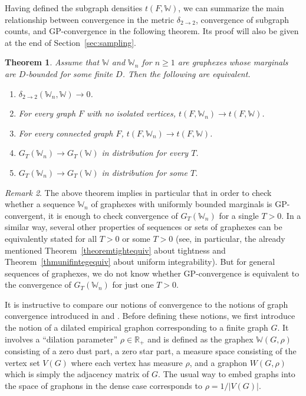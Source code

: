 \documentclass{amsart}
\numberwithin{equation}{section}
\numberwithin{figure}{section}
\newtheorem{theorem}{Theorem}[section]
\theoremstyle{definition}
\theoremstyle{remark}
\newtheorem{remark}[theorem]{Remark}
\newcommand{\RR}{\mathbb{R}}
\newcommand{\cW}{\mathbb{W}}
\newcommand{\deltt}{\delta_{2\to 2}}
\begin{document}
Having defined the subgraph densities $t(F,\cW)$, we can summarize the main
relationship between convergence in the metric $\deltt$, convergence of
subgraph counts, and GP-convergence in the following theorem. Its proof will
also be given at the end of Section~\ref{sec:sampling}.

\begin{theorem} \label{thm:D-bounded-convergence}
Assume that $\cW$ and $\cW_n$ for $n\geq 1$ are graphexes whose marginals are
$D$-bounded for some finite $D$. Then the following are equivalent.
\begin{enumerate}
\item $\deltt(\cW_n,\cW)\to 0$.\label{graphexconvdeltt-d}
\item For every graph $F$ with no isolated vertices, $t(F,\cW_n)
    \rightarrow t(F,\cW)$. \label{graphexconvnoisol-d}
\item For every connected graph $F$, $t(F,\cW_n) \rightarrow t(F,\cW)$.
    \label{graphexconvconn-d}
\item $G_T(\cW_n)\rightarrow G_T(\cW)$ in distribution for every $T$.
    \label{graphexconvallT-d}
\item $G_T(\cW_n)\rightarrow G_T(\cW)$ in distribution for some $T$.
    \label{graphexconvoneT-d}
\end{enumerate}
\end{theorem}

\begin{remark}
The above theorem implies in particular that in order to check whether a
sequence $\cW_n$ of graphexes with uniformly bounded marginals is
GP-convergent, it is enough to check convergence of $G_T(\cW_n)$ for a single
$T>0$. In a similar way, several other properties of sequences or sets of
graphexes can be equivalently stated for all $T>0$ or some $T>0$ (see, in
particular, the already mentioned Theorem~\ref{theoremtightequiv} about
tightness and Theorem~\ref{thmunifintegequiv} about uniform integrability).
But for general sequences of graphexes, we do not know whether GP-convergence
is equivalent to the convergence of $G_T(\cW_n)$ for just one $T>0$.
\end{remark}

It is instructive to compare our notions of convergence to the notions of
graph convergence introduced in \cite{BCCH16} and \cite{BCCV17}. Before
defining these notions, we first introduce the notion of a dilated empirical
graphon corresponding to a finite graph $G$. It involves a ``dilation
parameter'' $\rho\in\RR_+$ and is defined as the graphex $\cW(G,\rho)$
consisting of a zero dust part, a zero star part, a measure space consisting
of the vertex set $V(G)$ where each vertex has measure $\rho$, and a graphon
$W(G,\rho)$ which is simply the adjacency matrix of $G$. The usual way to
embed graphs into the space of graphons in the dense case corresponds to
$\rho=1/|V(G)|$.
\end{document}
